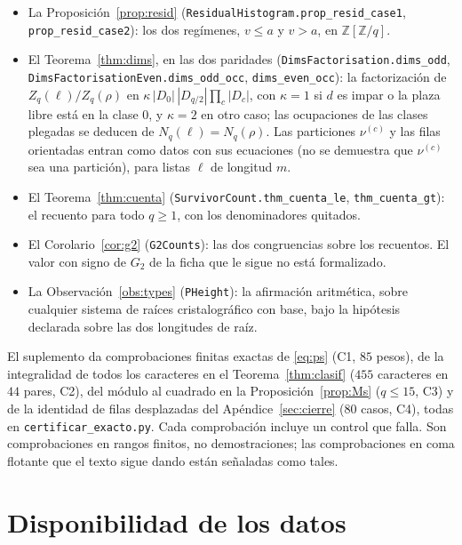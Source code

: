 \documentclass[11pt,a4paper]{article}
\begin{document}
\begin{itemize}
Proposición~\ref{prop:res}: las identidades de residuos (\texttt{ResidueCapacity.}\allowbreak\texttt{eq\_res},
\texttt{prop\_res\_cap}).
\item La Proposición~\ref{prop:resid} (\texttt{ResidualHistogram.}\allowbreak\texttt{prop\_resid\_case1},
\texttt{prop\_resid\_case2}): los dos regímenes, $v\le a$ y $v>a$, en $\mathbb{Z}[\mathbb{Z}/q]$.
\item El Teorema~\ref{thm:dims}, en las dos paridades (\texttt{DimsFactorisation.}\allowbreak\texttt{dims\_odd},
\texttt{DimsFactorisationEven.}\allowbreak\texttt{dims\_odd\_occ}, \texttt{dims\_even\_occ}): la factorización de
$Z_q(\ell)/Z_q(\rho)$ en $\kappa\,|D_0|\,|D_{q/2}|\prod_c|D_c|$, con $\kappa=1$ si $d$ es impar o la
plaza libre está en la clase $0$, y $\kappa=2$ en otro caso; las ocupaciones de las clases plegadas se
deducen de $N_q(\ell)=N_q(\rho)$. Las particiones $\nu^{(c)}$ y las filas orientadas entran como datos
con sus ecuaciones (no se demuestra que $\nu^{(c)}$ sea una partición), para listas $\ell$ de
longitud $m$.
\item El Teorema~\ref{thm:cuenta} (\texttt{SurvivorCount.}\allowbreak\texttt{thm\_cuenta\_le},
\texttt{thm\_cuenta\_gt}): el recuento para todo $q\ge1$, con los denominadores quitados.
\item El Corolario~\ref{cor:g2} (\texttt{G2Counts}): las dos congruencias sobre los recuentos. El
valor con signo de $G_2$ de la ficha que le sigue no está formalizado.
\item La Observación~\ref{obs:types} (\texttt{PHeight}): la afirmación aritmética, sobre cualquier
sistema de raíces cristalográfico con base, bajo la hipótesis declarada sobre las dos longitudes de
raíz.
\end{itemize}
\endgroup
El suplemento da comprobaciones finitas exactas de \eqref{eq:ps} (C1, $85$ pesos), de la
integralidad de todos los caracteres en el Teorema~\ref{thm:clasif} ($455$ caracteres en $44$ pares,
C2), del módulo al cuadrado en la Proposición~\ref{prop:Ms} ($q\le15$, C3) y de la identidad de
filas desplazadas del Apéndice~\ref{sec:cierre} ($80$ casos, C4), todas en
\texttt{certificar\_exacto.py}. Cada comprobación incluye un control que falla. Son comprobaciones en
rangos finitos, no demostraciones; las comprobaciones en coma flotante que el texto sigue dando
están señaladas como tales.

\section*{Disponibilidad de los datos}
\end{document}
